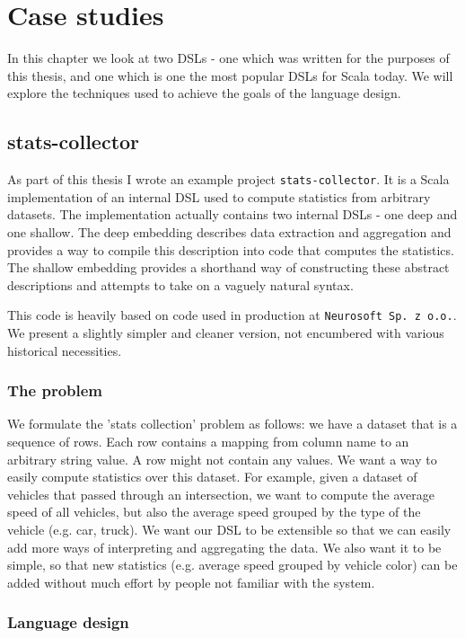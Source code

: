 \chapter{Case studies}

In this chapter we look at two DSLs - one which was written for the purposes of this thesis, and one which is one the most popular DSLs for Scala today.
We will explore the techniques used to achieve the goals of the language design.

\section{stats-collector}

As part of this thesis I wrote an example project \texttt{stats-collector}.
It is a Scala implementation of an internal DSL used to compute statistics from arbitrary datasets.
The implementation actually contains two internal DSLs - one deep and one shallow.
The deep embedding describes data extraction and aggregation and provides a way to compile this description into code that computes the statistics.
The shallow embedding provides a shorthand way of constructing these abstract descriptions and attempts to take on a vaguely natural syntax.

This code is heavily based on code used in production at \texttt{Neurosoft~Sp.~z~o.o.}.
We present a slightly simpler and cleaner version, not encumbered with various historical necessities.

\subsection{The problem}

We formulate the 'stats collection' problem as follows: we have a dataset that is a sequence of rows.
Each row contains a mapping from column name to an arbitrary string value.
A row might not contain any values.
We want a way to easily compute statistics over this dataset.
For example, given a dataset of vehicles that passed through an intersection, we want to compute the average speed of all vehicles, but also the average speed grouped by the type of the vehicle (e.g. car, truck).
We want our DSL to be extensible so that we can easily add more ways of interpreting and aggregating the data.
We also want it to be simple, so that new statistics (e.g. average speed grouped by vehicle color) can be added without much effort by people not familiar with the system.

\subsection{Language design}

